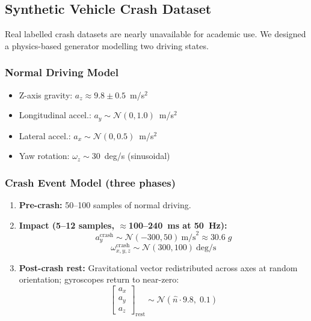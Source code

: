 \documentclass[12pt,a4paper]{article}
\begin{document}
\subsection{Synthetic Vehicle Crash Dataset}

Real labelled crash datasets are nearly unavailable for academic use.
We designed a physics-based generator modelling two driving states.

\subsubsection*{Normal Driving Model}
\begin{itemize}
  \item Z-axis gravity: $a_z \approx 9.8 \pm 0.5$~m/s$^2$
  \item Longitudinal accel.: $a_y \sim \mathcal{N}(0,1.0)$~m/s$^2$
  \item Lateral accel.: $a_x \sim \mathcal{N}(0,0.5)$~m/s$^2$
  \item Yaw rotation: $\omega_z \sim 30$~deg/s (sinusoidal)
\end{itemize}

\subsubsection*{Crash Event Model (three phases)}
\begin{enumerate}
  \item \textbf{Pre-crash:} 50--100 samples of normal driving.
  \item \textbf{Impact (5--12 samples, $\approx$100--240~ms at 50~Hz):}
    \begin{equation}
      a_y^{\text{crash}} \sim \mathcal{N}(-300,50)~\text{m/s}^2
      \approx 30.6\;g \label{eq:crash_accel}
    \end{equation}
    \begin{equation}
      \omega_{x,y,z}^{\text{crash}} \sim \mathcal{N}(300,100)~\text{deg/s}
      \label{eq:crash_gyro}
    \end{equation}
  \item \textbf{Post-crash rest:} Gravitational vector redistributed
        across axes at random orientation; gyroscopes return to near-zero:
    \begin{equation}
      \begin{bmatrix}a_x\\a_y\\a_z\end{bmatrix}_{\text{rest}}
      \sim \mathcal{N}\!\left(\hat{n}\cdot 9.8,\;0.1\right)
      \label{eq:post_crash}
    \end{equation}
\end{enumerate}
\end{document}
